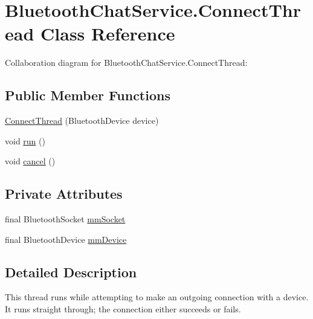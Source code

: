 \hypertarget{classcom_1_1example_1_1android_1_1_bluetooth_chat_1_1_bluetooth_chat_service_1_1_connect_thread}{\section{Bluetooth\-Chat\-Service.\-Connect\-Thread Class Reference}
\label{classcom_1_1example_1_1android_1_1_bluetooth_chat_1_1_bluetooth_chat_service_1_1_connect_thread}
}


Collaboration diagram for Bluetooth\-Chat\-Service.\-Connect\-Thread\-:
\subsection*{Public Member Functions}
\begin{DoxyCompactItemize}
\item 
\hyperlink{classcom_1_1example_1_1android_1_1_bluetooth_chat_1_1_bluetooth_chat_service_1_1_connect_thread_a44953b58b3e56284605861cd8dc6c1b6}{Connect\-Thread} (Bluetooth\-Device device)
\item 
void \hyperlink{classcom_1_1example_1_1android_1_1_bluetooth_chat_1_1_bluetooth_chat_service_1_1_connect_thread_a13a43e6d814de94978c515cb084873b1}{run} ()
\item 
void \hyperlink{classcom_1_1example_1_1android_1_1_bluetooth_chat_1_1_bluetooth_chat_service_1_1_connect_thread_a02d5fa6b14e221f3012a794b905be166}{cancel} ()
\end{DoxyCompactItemize}
\subsection*{Private Attributes}
\begin{DoxyCompactItemize}
\item 
final Bluetooth\-Socket \hyperlink{classcom_1_1example_1_1android_1_1_bluetooth_chat_1_1_bluetooth_chat_service_1_1_connect_thread_a671e27e36a6f6af999136e22c3f98006}{mm\-Socket}
\item 
final Bluetooth\-Device \hyperlink{classcom_1_1example_1_1android_1_1_bluetooth_chat_1_1_bluetooth_chat_service_1_1_connect_thread_ad27e43ebcc6efac79c350009f29964fc}{mm\-Device}
\end{DoxyCompactItemize}


\subsection{Detailed Description}
This thread runs while attempting to make an outgoing connection with a device. It runs straight through; the connection either succeeds or fails. 

